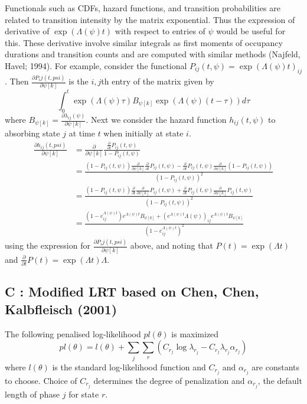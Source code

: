 \documentclass{uwstat572}
\begin{document}
Functionals such as CDFs, hazard functions, and transition probabilities are related to transition intensity by the matrix exponential. Thus the expression of derivative of $\exp(\Lambda(\psi)t)$ with respect to entries of $\psi$ would be useful for this. These derivative involve similar integrals as first moments of occupancy durations and transition counts and are computed with similar methods (Najfeld, Havel; 1994). For example, consider the functional $P_{ij}(t,\psi) = \exp (\Lambda(\psi)t)_{ij}$. Then $\frac{\partial P_ij(t,psi)}{\partial \psi [k]}$ is the $i,j$th entry of the matrix given by \[\int_{0}^t \exp (\Lambda (\psi) \tau) B_{\psi [k]} \exp (\Lambda (\psi) (t-\tau)) d \tau\] 
where $B_{\psi [k]} = \frac{\partial \lambda_{ij} (\psi)}{\partial \psi [k]}$. Next we consider the hazard function $h_{ij}(t,\psi)$ to absorbing state $j$  at time $t$ when initially at state $i$. \begin{align*}
\frac{\partial h_{ij}(t,psi)}{\partial \psi [k]} &= \frac{\partial}{\partial \psi [k]} \frac{\frac{\partial}{\partial t}P_{ij}(t,\psi)}{1-P_{ij}(t,\psi)}\\
& =\frac{(1-P_{ij}(t,\psi))\frac{\partial}{\partial \psi [k]} \frac{\partial}{\partial t}P_{ij}(t,\psi)- \frac{\partial}{\partial t}P_{ij}(t,\psi)\frac{\partial}{\partial \psi [k]} (1-P_{ij}(t,\psi))}{(1-P_{ij}(t,\psi))^2}\\
& =\frac{(1-P_{ij}(t,\psi)) \frac{\partial}{\partial t}\frac{\partial}{\partial \psi [k]}P_{ij}(t,\psi) + \frac{\partial}{\partial t}P_{ij}(t,\psi)\frac{\partial}{\partial \psi [k]} P_{ij}(t,\psi)}{(1-P_{ij}(t,\psi))^2}\\
&= \frac{(1-e^{\Lambda (\psi) t}_{ij}) e^{\Lambda (\psi) t} B_{\psi [k]} + (e^{\Lambda (\psi) t} \Lambda (\psi) )_{ij} e^{\Lambda (\psi) t} B_{\psi [k]}}{(1-e^{\Lambda (\psi) t}_{ij})^2}
\end{align*}
using the expression for $\frac{\partial P_ij(t,psi)}{\partial \psi [k]}$ above, and noting that $P(t)= \exp(\Lambda t)$ and $\frac{\partial}{\partial t} P(t) = \exp(\Lambda t) \Lambda$.
\subsection*{C : Modified LRT based on Chen, Chen, Kalbfleisch (2001)}
The following penalised log-likelihood $pl(\theta)$ is maximized
\[
pl(\theta) = l(\theta) + \sum_{j}\sum_{r} (C_{r_j} \log \lambda_{r_j} - C_{r_j} \lambda_{r_j} \alpha_{r_j})
\]
where $l(\theta)$ is the standard log-likelihood function and $C_{r_j}$ and $\alpha_{r_j}$ are constants to choose. Choice of $C_{r_j}$ determines the degree of penalization and $\alpha_{r_j}$, the default length of phase $j$ for state $r$.
\end{document}
